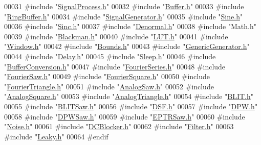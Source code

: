 \begin{DoxyCode}
00031 \textcolor{preprocessor}{#include "\hyperlink{_signal_process_8h}{SignalProcess.h}"}
00032 \textcolor{preprocessor}{#include "\hyperlink{_buffer_8h}{Buffer.h}"}
00033 \textcolor{preprocessor}{#include "\hyperlink{_ring_buffer_8h}{RingBuffer.h}"}
00034 \textcolor{preprocessor}{#include "\hyperlink{_signal_generator_8h}{SignalGenerator.h}"}
00035 \textcolor{preprocessor}{#include "\hyperlink{_sine_8h}{Sine.h}"}
00036 \textcolor{preprocessor}{#include "\hyperlink{_sinc_8h}{Sinc.h}"}
00037 \textcolor{preprocessor}{#include "\hyperlink{_denormal_8h}{Denormal.h}"}
00038 \textcolor{preprocessor}{#include "Math.h"}
00039 \textcolor{preprocessor}{#include "\hyperlink{_blackman_8h}{Blackman.h}"}
00040 \textcolor{preprocessor}{#include "\hyperlink{_l_u_t_8h}{LUT.h}"}
00041 \textcolor{preprocessor}{#include "\hyperlink{_window_8h}{Window.h}"}
00042 \textcolor{preprocessor}{#include "\hyperlink{_bounds_8h}{Bounds.h}"}
00043 \textcolor{preprocessor}{#include "\hyperlink{_generic_generator_8h}{GenericGenerator.h}"}
00044 \textcolor{preprocessor}{#include "\hyperlink{_delay_8h}{Delay.h}"}
00045 \textcolor{preprocessor}{#include "\hyperlink{_sleep_8h}{Sleep.h}"}
00046 \textcolor{preprocessor}{#include "\hyperlink{_buffer_conversion_8h}{BufferConversion.h}"}
00047 \textcolor{preprocessor}{#include "\hyperlink{_fourier_series_8h}{FourierSeries.h}"}
00048 \textcolor{preprocessor}{#include "\hyperlink{_fourier_saw_8h}{FourierSaw.h}"}
00049 \textcolor{preprocessor}{#include "\hyperlink{_fourier_square_8h}{FourierSquare.h}"}
00050 \textcolor{preprocessor}{#include "\hyperlink{_fourier_triangle_8h}{FourierTriangle.h}"}
00051 \textcolor{preprocessor}{#include "\hyperlink{_analog_saw_8h}{AnalogSaw.h}"}
00052 \textcolor{preprocessor}{#include "\hyperlink{_analog_square_8h}{AnalogSquare.h}"}
00053 \textcolor{preprocessor}{#include "\hyperlink{_analog_triangle_8h}{AnalogTriangle.h}"}
00054 \textcolor{preprocessor}{#include "\hyperlink{_b_l_i_t_8h}{BLIT.h}"}
00055 \textcolor{preprocessor}{#include "\hyperlink{_b_l_i_t_saw_8h}{BLITSaw.h}"}
00056 \textcolor{preprocessor}{#include "\hyperlink{_d_s_f_8h}{DSF.h}"}
00057 \textcolor{preprocessor}{#include "\hyperlink{_d_p_w_8h}{DPW.h}"}
00058 \textcolor{preprocessor}{#include "\hyperlink{_d_p_w_saw_8h}{DPWSaw.h}"}
00059 \textcolor{preprocessor}{#include "\hyperlink{_e_p_t_r_saw_8h}{EPTRSaw.h}"}
00060 \textcolor{preprocessor}{#include "\hyperlink{_noise_8h}{Noise.h}"}
00061 \textcolor{preprocessor}{#include "\hyperlink{_d_c_blocker_8h}{DCBlocker.h}"}
00062 \textcolor{preprocessor}{#include "\hyperlink{_filter_8h}{Filter.h}"}
00063 \textcolor{preprocessor}{#include "\hyperlink{_leaky_8h}{Leaky.h}"}
00064 \textcolor{preprocessor}{#endif}
\end{DoxyCode}
